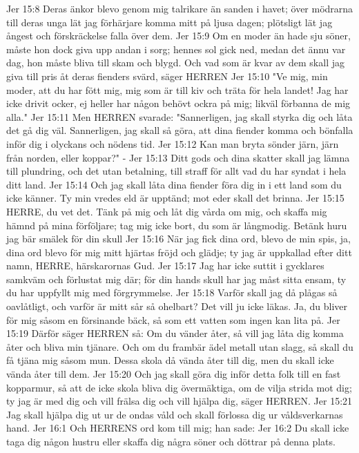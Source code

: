 Jer 15:8  Deras änkor blevo genom mig talrikare än sanden i havet; över mödrarna till deras unga lät jag förhärjare komma mitt på ljusa dagen; plötsligt lät jag ångest och förskräckelse falla över dem.
Jer 15:9  Om en moder än hade sju söner, måste hon dock giva upp andan i sorg; hennes sol gick ned, medan det ännu var dag, hon måste bliva till skam och blygd. Och vad som är kvar av dem skall jag giva till pris åt deras fienders svärd, säger HERREN
Jer 15:10  "Ve mig, min moder, att du har fött mig, mig som är till kiv och träta för hela landet! Jag har icke drivit ocker, ej heller har någon behövt ockra på mig; likväl förbanna de mig alla."
Jer 15:11  Men HERREN svarade: "Sannerligen, jag skall styrka dig och låta det gå dig väl. Sannerligen, jag skall så göra, att dina fiender komma och bönfalla inför dig i olyckans och nödens tid.
Jer 15:12  Kan man bryta sönder järn, järn från norden, eller koppar?" -
Jer 15:13  Ditt gods och dina skatter skall jag lämna till plundring, och det utan betalning, till straff för allt vad du har syndat i hela ditt land.
Jer 15:14  Och jag skall låta dina fiender föra dig in i ett land som du icke känner. Ty min vredes eld är upptänd; mot eder skall det brinna.
Jer 15:15  HERRE, du vet det. Tänk på mig och låt dig vårda om mig, och skaffa mig hämnd på mina förföljare; tag mig icke bort, du som är långmodig. Betänk huru jag bär smälek för din skull
Jer 15:16  När jag fick dina ord, blevo de min spis, ja, dina ord blevo för mig mitt hjärtas fröjd och glädje; ty jag är uppkallad efter ditt namn, HERRE, härskarornas Gud.
Jer 15:17  Jag har icke suttit i gycklares samkväm och förlustat mig där; för din hands skull har jag måst sitta ensam, ty du har uppfyllt mig med förgrymmelse.
Jer 15:18  Varför skall jag då plågas så oavlåtligt, och varför är mitt sår så ohelbart? Det vill ju icke läkas. Ja, du bliver för mig såsom en försinande bäck, så som ett vatten som ingen kan lita på.
Jer 15:19  Därför säger HERREN så: Om du vänder åter, så vill jag låta dig komma åter och bliva min tjänare. Och om du frambär ädel metall utan slagg, så skall du få tjäna mig såsom mun. Dessa skola då vända åter till dig, men du skall icke vända åter till dem.
Jer 15:20  Och jag skall göra dig inför detta folk till en fast kopparmur, så att de icke skola bliva dig övermäktiga, om de vilja strida mot dig; ty jag är med dig och vill frälsa dig och vill hjälpa dig, säger HERREN.
Jer 15:21  Jag skall hjälpa dig ut ur de ondas våld och skall förlossa dig ur våldsverkarnas hand.
Jer 16:1  Och HERRENS ord kom till mig; han sade:
Jer 16:2  Du skall icke taga dig någon hustru eller skaffa dig några söner och döttrar på denna plats.
